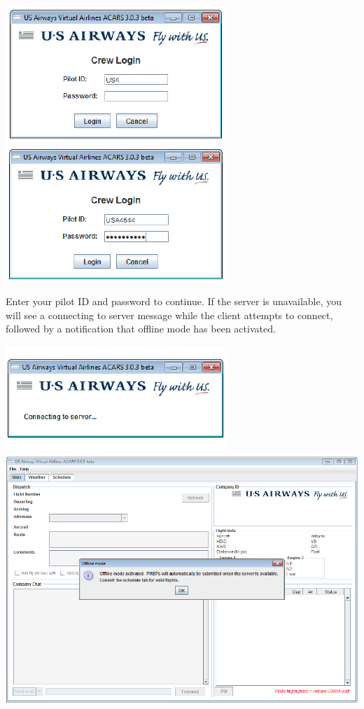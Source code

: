 \documentclass[12pt]{article}
\begin{document}
\begin{center}
\includegraphics[scale=1]{Image2b.pdf} \hfill \includegraphics[scale=1]{Image2c.pdf}
\end{center}

Enter your pilot ID and password to continue.
If the server is unavailable, you will see a connecting to server message while the client attempts to connect, followed by a notification that offline mode has been activated.

\begin{center}
\includegraphics[scale=1]{Image3.pdf}
\includegraphics[scale=1]{Image4.pdf}
\end{center}
\end{document}
